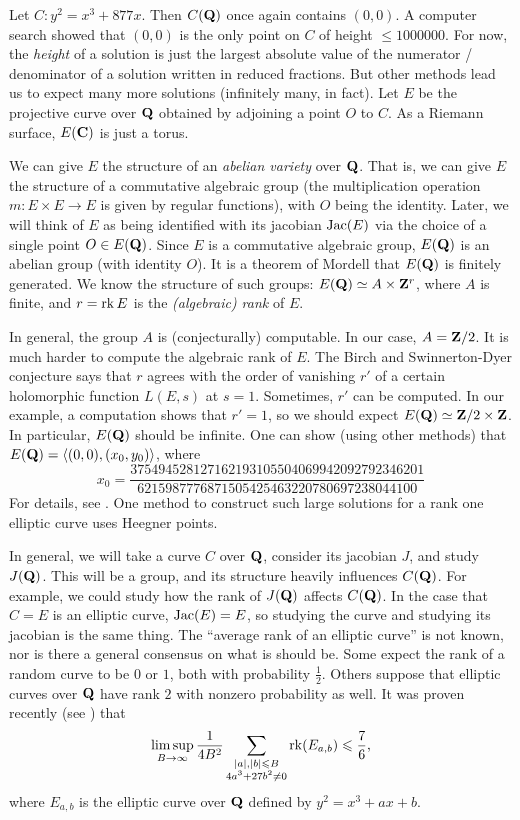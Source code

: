 \begin{example}
Let $C:y^2=x^3+877 x$. Then $C(\mathbf{Q})$ once again contains $(0,0)$. A 
computer search showed that $(0,0)$ is the only point on $C$ of height 
$\leqslant 1000000$. For now, the \emph{height} of a solution is just the 
largest absolute value of the numerator / denominator of a solution written 
in reduced fractions. But other methods lead us to expect many more solutions
(infinitely many, in fact). Let $E$ be the projective curve over $\mathbf{Q}$ obtained 
by adjoining a point $O$ to $C$. As a Riemann surface, $E(\mathbf{C})$ is just a 
torus. 

We can give $E$ the 
structure of an \emph{abelian variety} over $\mathbf{Q}$. That is, we can give $E$ the 
structure of a commutative algebraic group (the multiplication operation 
$m:E\times E\to E$ is given by regular functions), 
with $O$ being the identity. Later, we will think of $E$ as 
being identified with its jacobian $\operatorname{Jac}(E)$ via the choice of a single point 
$O\in E(\mathbf{Q})$. Since $E$ is a commutative algebraic group, $E(\mathbf{Q})$ is an 
abelian group (with identity $O$). It is a theorem of Mordell that $E(\mathbf{Q})$ is 
finitely generated. We know the structure of such groups: 
$E(\mathbf{Q})\simeq A\times \mathbf{Z}^r$, where $A$ is finite, and $r=\operatorname{rk} E$ 
is the \emph{(algebraic) rank} of $E$. 

In general, the group $A$ is (conjecturally) computable. 
In our case, $A=\mathbf{Z}/2$. It is much harder to 
compute the algebraic rank of $E$. The Birch and Swinnerton-Dyer 
conjecture says that $r$ agrees with the order of vanishing $r'$ of a certain 
holomorphic function $L(E,s)$ at $s=1$. Sometimes, $r'$ can be computed.  
In our example, a computation shows that $r'=1$, so we should expect 
$E(\mathbf{Q})\simeq \mathbf{Z}/2\times\mathbf{Z}$. In particular, 
$E(\mathbf{Q})$ should be infinite. One can show (using other methods) that 
$E(\mathbf{Q})=\langle (0,0),(x_0,y_0)\rangle$, where 
\[
  x_0 = \frac{37 5494 5281 2716 2193 1055 0406 9942 0927 9234 6201}{6215 9877 7687 1505 4254 6322 0780 6972 3804 4100}
\]
For details, see \cite{br84}. One method to construct such large solutions for 
a rank one elliptic curve uses Heegner points. 
\end{example}

In general, we will take a curve $C$ over $\mathbf{Q}$, consider its jacobian $J$, and study 
$J(\mathbf{Q})$. This will be a group, and its structure heavily influences $C(\mathbf{Q})$. 
For example, we could study how the rank of $J(\mathbf{Q})$ affects $C(\mathbf{Q})$. In the 
case that $C=E$ is an elliptic curve, $\operatorname{Jac}(E)=E$, so studying the curve and 
studying its jacobian is the same thing. The ``average rank of an elliptic 
curve'' is not known, nor is there a general consensus on what is should be. 
Some expect the rank of a random curve to be $0$ or $1$, both with 
probability $\frac 1 2$. Others suppose that elliptic curves over $\mathbf{Q}$ have 
rank $2$ with nonzero probability as well. It was proven recently (see 
\cite[\S 1]{bh10}) that 
\[
  \limsup_{B\to\infty} \frac{1}{4 B^2} \sum_{\substack{|a|,|b|\leqslant B \\ 4 a^3+27 b^2\ne 0}} \operatorname{rk}(E_{a,b}) \leqslant\frac 7 6 \text{,}
\]
where $E_{a,b}$ is the elliptic curve over $\mathbf{Q}$ defined by $y^2=x^3 +a x+b$.

